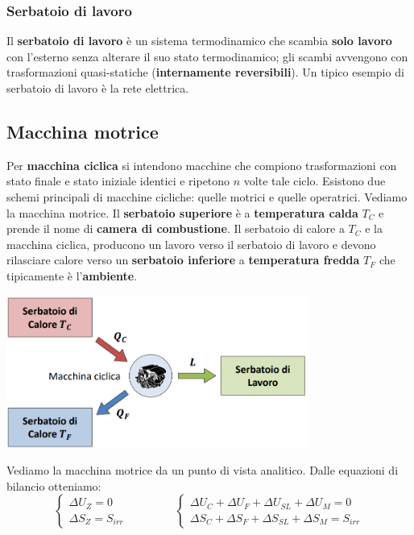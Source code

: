 \subsubsection{Serbatoio di lavoro}
Il \textbf{serbatoio di lavoro} è un sistema termodinamico che scambia \textbf{solo lavoro} con l'esterno senza alterare il suo stato termodinamico; gli scambi avvengono con trasformazioni quasi-statiche (\textbf{internamente reversibili}).\newline
\newline
Un tipico esempio di serbatoio di lavoro è la rete elettrica.
\subsection{Macchina motrice}
Per \textbf{macchina ciclica} si intendono macchine che compiono trasformazioni con stato finale e stato iniziale identici e ripetono $n$ volte tale ciclo.\newline
\newline
Esistono due schemi principali di macchine cicliche: quelle motrici e quelle operatrici. Vediamo la macchina motrice. \newline
\newline
Il \textbf{serbatoio superiore} è a \textbf{temperatura calda} $T_C$ e prende il nome di \textbf{camera di combustione}.\newline
Il serbatoio di calore a $T_C$ e la macchina ciclica, producono un lavoro verso il serbatoio di lavoro e devono rilasciare calore verso un \textbf{serbatoio inferiore} a \textbf{temperatura fredda} $T_F$ che tipicamente è l'\textbf{ambiente}.
\begin{center}
    \includegraphics[height=5cm]{../L05/img2.PNG}
\end{center}
Vediamo la macchina motrice da un punto di vista analitico.\newline
Dalle equazioni di bilancio otteniamo:
\[
    \begin{cases}
        \Delta U_Z = 0\\ \Delta S_Z = S_{irr}
    \end{cases} \;\;\;\;\;\;\;\;\;\;\;\;\;\;\; \begin{cases}
        \Delta U_C + \Delta U_F + \Delta U_{SL} + \Delta U_M = 0 \\
        \Delta S_C + \Delta S_F + \Delta S_{SL} + \Delta S_M = S_{irr}
    \end{cases}
\]

